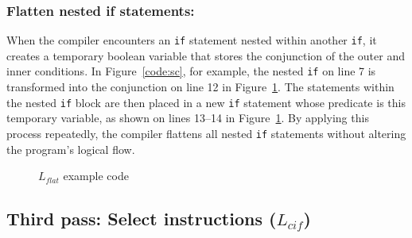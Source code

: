 \subsubsection{Flatten nested if statements:}
When the compiler encounters an \texttt{if} statement nested within another \texttt{if}, it creates a temporary boolean variable that stores the conjunction of the outer and inner conditions. In Figure~\ref{code:sc}, for example, the nested \texttt{if} on line 7 is transformed into the conjunction on line 12 in Figure~\ref{code:flat}. The statements within the nested \texttt{if} block are then placed in a new \texttt{if} statement whose predicate is this temporary variable, as shown on lines 13–14 in Figure~\ref{code:flat}. By applying this process repeatedly, the compiler flattens all nested \texttt{if} statements without altering the program’s logical flow.

\begin{figure}[h!]
	
	\caption{$L_{flat}$ example code}
	\label{code:flat}
\end{figure}


\subsection{Third pass: Select instructions ($L_{cif}$)}

\lipsum[2-3]
